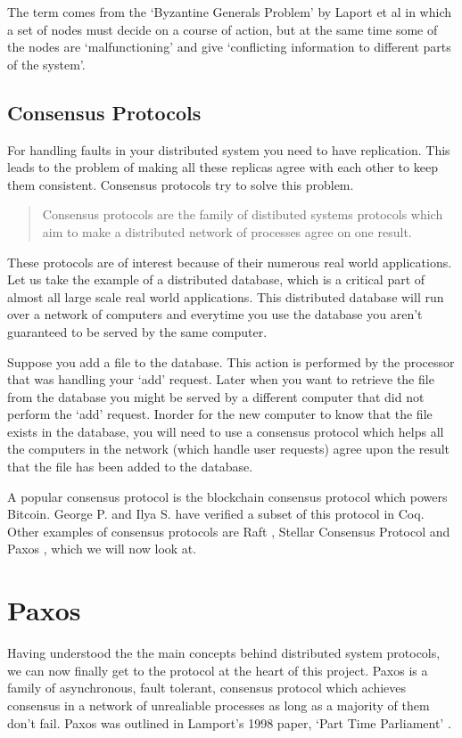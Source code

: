 The term comes from the `Byzantine Generals Problem' by Laport et al \cite{3}
in which a set of nodes must decide on a course of action, but at the same time
some of the nodes are `malfunctioning' and give `conflicting information to
different parts of the system'.

\subsection{Consensus Protocols}
For handling faults in your distributed system you need to have replication.
This leads to the problem of making all these replicas agree with each other
to keep them consistent. Consensus protocols try to solve this problem.

\begin{quote}
Consensus protocols are the family of distibuted systems protocols which aim to
make a distributed network of processes agree on one result.
\end{quote}

These protocols are of interest because of their numerous real world applications.
Let us take the example of a distributed database, which is a critical part of almost
all large scale real world applications. This distributed database will run
over a network of computers and everytime you use the database you aren't guaranteed
to be served by the same computer.

Suppose you add a file to the database. This action is performed by the processor that
was handling your `add' request. Later when you want to retrieve the file from the database
you might be served by a different computer that did not perform the `add' request. Inorder
for the new computer to know that the file exists in the database, you will need to use a
consensus protocol which helps all the computers in the network (which handle user
requests) agree upon the result that the file has been added to the database.

A popular consensus protocol is the blockchain consensus protocol which powers Bitcoin.
George P. and Ilya S. \cite{5} have verified a subset of this protocol in Coq. Other
examples of consensus protocols are Raft \cite{12}, Stellar Consensus Protocol \cite{13}
and Paxos \cite{14}, which we will now look at.


\section{Paxos}
Having understood the the main concepts behind distributed system protocols, we can
now finally get to the protocol at the heart of this project. Paxos is a family of
asynchronous, fault tolerant, consensus protocol which achieves consensus in a network
of unrealiable processes as long as a majority of them don't fail. Paxos was
outlined in Lamport's 1998 paper, `Part Time Parliament' \cite{4}.


